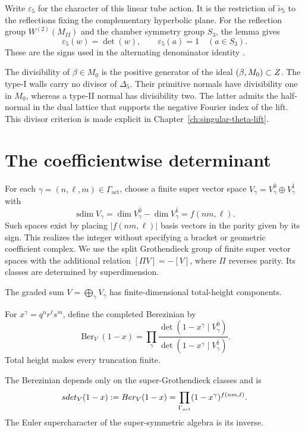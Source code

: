 Write \(\varepsilon_5\) for the character of this linear tube action.
It is the restriction of \(\widetilde\nu_5\) to the reflections
fixing the complementary hyperbolic plane.
For the reflection group \(W^{(2)}(M_{II})\) and the chamber
symmetry group \(S_3\), the lemma gives
\[
 \varepsilon_5(w)=\det(w),\qquad
 \varepsilon_5(a)=1\quad(a\in S_3).
\]
These are the signs used in the alternating denominator identity
\cite[Propositions 2.1--2.2]{GN}.

The divisibility of \(\beta\in M_0\) is the positive generator
of the ideal \((\beta,M_0)\subset Z\).
The type-I walls carry no divisor of \(\Delta_5\).
Their primitive normals have divisibility
one in \(M_0\), whereas a type-II normal has divisibility two.
The latter admits the half-normal in the dual lattice that supports
the negative Fourier index of the lift.  This divisor criterion is
made explicit in Chapter~\ref{ch:singular-theta-lift}.

\section{The coefficientwise determinant}
\label{sec:view1-K0-determinant-identification}

For each \(\gamma=(n,\ell,m)\in\Gamma_{\mathrm{act}}\), choose
a finite super vector space \(V_\gamma=V_\gamma^{\bar0}\oplus
V_\gamma^{\bar1}\) with
\[
 \operatorname{sdim}V_\gamma
 =\dim V_\gamma^{\bar0}-\dim V_\gamma^{\bar1}=f(nm,\ell).
\]
Such spaces exist by placing \(|f(nm,\ell)|\) basis vectors
in the parity given by its sign.
This realizes the integer without specifying a bracket or geometric
coefficient complex.
We use the split Grothendieck group of finite super vector spaces
with the additional relation \([\Pi V]=-[V]\), where \(\Pi\)
reverses parity.  Its classes are determined by superdimension.

The graded sum \(V=\bigoplus_\gamma V_\gamma\) has
finite-dimensional total-height components.

For \(x^\gamma=q^nr^\ell s^m\), define the completed Berezinian by
\[
 \operatorname{Ber}_{V}(1-x)=
 \prod_\gamma
 \frac{\det(1-x^\gamma\mid V_\gamma^{\bar0})}
      {\det(1-x^\gamma\mid V_\gamma^{\bar1})}.
\]
Total height makes every truncation finite.

\begin{lemma}
\label{lem:view1-K0-Fock-superdeterminant}
The Berezinian depends only on the super-Grothendieck classes and is
\[
 sdet_V(1-x):=Ber_V(1-x)
 =\prod_{\Gamma_{act}}(1-x^\gamma)^{f(nm,\ell)}.
\]
The Euler supercharacter of the super-symmetric algebra is its inverse.
\end{lemma}

